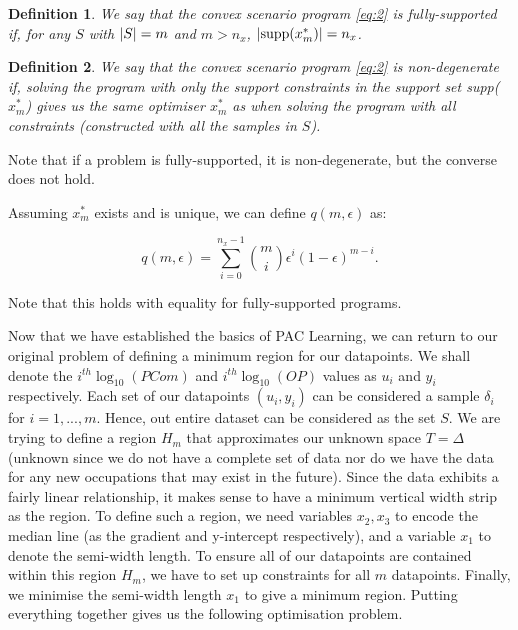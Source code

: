 \documentclass[11pt]{article}
\newtheorem{theorem}{Definition}
\begin{document}
\begin{theorem}
	We say that the convex scenario program \ref{eq:2} is fully-supported if, for any $S$ with $\abs{S} = m$ and $m > n_{x}$, $\abs{\text{supp}(x^{*}_{m})} = n_{x}$.
\end{theorem}

\begin{theorem}
	We say that the convex scenario program \ref{eq:2} is non-degenerate if, solving the program with only the support constraints in the support set supp($x^{*}_{m}$) gives us the same optimiser $x^{*}_{m}$ as when solving the program with all constraints (constructed with all the samples in $S$).
\end{theorem}

Note that if a problem is fully-supported, it is non-degenerate, but the converse does not hold.

Assuming $x^{*}_{m}$ exists and is unique, we can define $q(m,\epsilon)$ as:

\begin{equation}
	\label{eq:4}
	q(m,\epsilon) = \sum_{i=0}^{n_{x}-1}{m \choose i}\epsilon^{i}(1-\epsilon)^{m-i}.
\end{equation}

Note that this holds with equality for fully-supported programs.

Now that we have established the basics of PAC Learning, we can return to our original problem of defining a minimum region for our datapoints. We shall denote the $i^{th} \log_{10}(PCom)$ and $i^{th} \log_{10}(OP)$ values as $u_{i}$ and $y_{i}$ respectively. Each set of our datapoints $(u_{i}, y_{i})$ can be considered a sample $\delta_{i}$ for $i=1,...,m$. Hence, out entire dataset can be considered as the set $S$.  We are trying to define a region $H_{m}$ that approximates our unknown space $T=\Delta$ (unknown since we do not have a complete set of data nor do we have the data for any new occupations that may exist in the future). Since the data exhibits a fairly linear relationship, it makes sense to have a minimum vertical width strip as the region. To define such a region, we need variables $x_{2}, x_{3}$ to encode the median line (as the gradient and y-intercept respectively), and a variable $x_{1}$ to denote the semi-width length. To ensure all of our datapoints are contained within this region $H_{m}$, we have to set up constraints for all $m$ datapoints. Finally, we minimise the semi-width length $x_{1}$ to give a minimum region. Putting everything together gives us the following optimisation problem.
\end{document}

